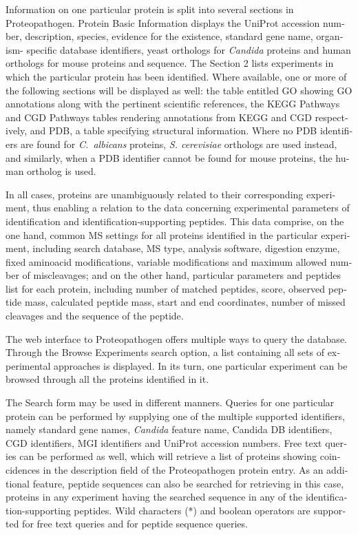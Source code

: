 \begin{otherlanguage}{british}
Information on one particular protein is split into several
sections in Proteopathogen. Protein Basic Information
displays the UniProt accession number, description, species,
evidence for the existence, standard gene name, organism-
specific database identifiers, yeast orthologs for \textit{Candida}
proteins and human orthologs for mouse proteins and
sequence. The Section 2 lists experiments in which the
particular protein has been identified. Where available,
one or more of the following sections will be displayed
as well: the table entitled GO showing GO annotations
along with the pertinent scientific references, the KEGG
Pathways and CGD Pathways tables rendering annotations
from KEGG and CGD respectively, and PDB, a table
specifying structural information. Where no PDB identifiers
are found for \textit{\mbox{C. albicans}} proteins, \textit{S. cerevisiae} orthologs
are used instead, and similarly, when a PDB identifier
cannot be found for mouse proteins, the human ortholog
is used.

In all cases, proteins are unambiguously related to their
corresponding experiment, thus enabling a relation to the
data concerning experimental parameters of identification
and identification-supporting peptides. This data comprise,
on the one hand, common MS settings for all proteins
identified in the particular experiment, including search
database, MS type, analysis software, digestion enzyme,
fixed aminoacid modifications, variable modifications and
maximum allowed number of miscleavages; and on the
other hand, particular parameters and peptides list for each
protein, including number of matched peptides, score,
observed peptide mass, calculated peptide mass, start and
end coordinates, number of missed cleavages and the
sequence of the peptide.

The web interface to Proteopathogen offers multiple
ways to query the database. Through the Browse Experiments
search option, a list containing all sets of experimental
approaches is displayed. In its turn, one particular
experiment can be browsed through all the proteins
identified in it.

The Search form may be used in different manners.
Queries for one particular protein can be performed by
supplying one of the multiple supported identifiers, namely
standard gene names, \textit{Candida} feature name, Candida DB
identifiers, CGD identifiers, MGI identifiers and UniProt
accession numbers. Free text queries can be performed as
well, which will retrieve a list of proteins showing coincidences
 in the description field of the Proteopathogen
protein entry. As an additional feature, peptide sequences
can also be searched for retrieving in this case, proteins in
any experiment having the searched sequence in any of the
identification-supporting peptides. Wild characters (*)
and boolean operators are supported for free text queries
and for peptide sequence queries.


\end{otherlanguage}
